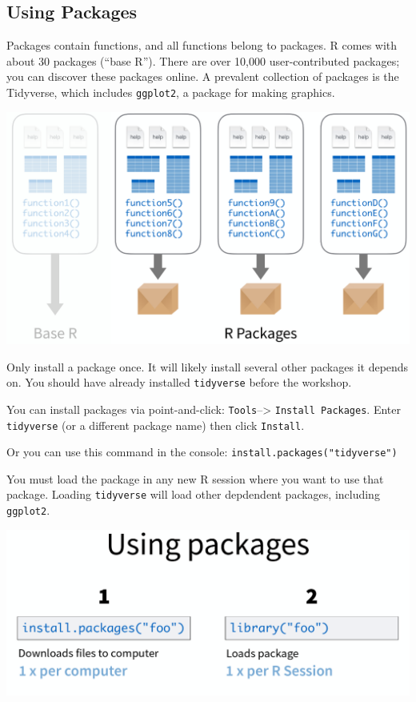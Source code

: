 \documentclass[]{article}
\begin{document}
\hypertarget{using-packages}{%
\subsection{Using Packages}\label{using-packages}}

Packages contain functions, and all functions belong to packages. R
comes with about 30 packages (``base R''). There are over 10,000
user-contributed packages; you can discover these packages online. A
prevalent collection of packages is the Tidyverse, which includes
\texttt{ggplot2}, a package for making graphics.

\begin{center}\includegraphics[width=0.9\linewidth]{images/packages} \end{center}

Only install a package once. It will likely install several other
packages it depends on. You should have already installed
\texttt{tidyverse} before the workshop.

You can install packages via point-and-click:
\texttt{Tools}--\textgreater{} \texttt{Install\ Packages}. Enter
\texttt{tidyverse} (or a different package name) then click
\texttt{Install}.

Or you can use this command in the console:
\texttt{install.packages("tidyverse")}

You must load the package in any new R session where you want to use
that package. Loading \texttt{tidyverse} will load other depdendent
packages, including \texttt{ggplot2}.

\begin{center}\includegraphics[width=0.9\linewidth]{images/using-packages} \end{center}
\end{document}
